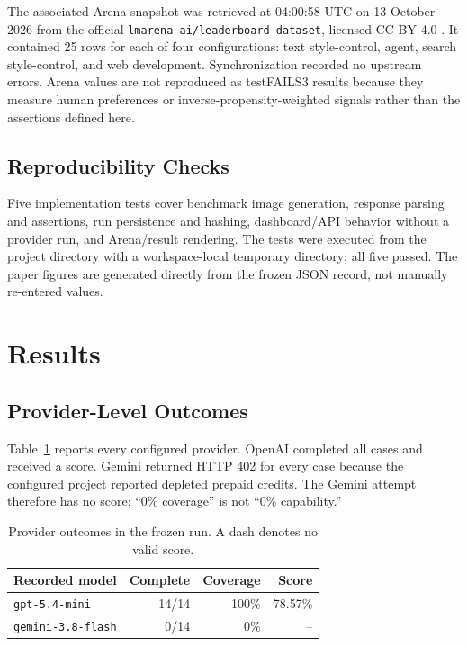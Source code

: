 \documentclass[10pt,twocolumn]{article}
\newcommand{\system}{testFAILS3}
\begin{document}
The associated Arena snapshot was retrieved at 04:00:58 UTC on 13 October 2026 from the official \texttt{lmarena-ai/leaderboard-dataset}, licensed CC BY 4.0 \cite{arenaDataset}. It contained 25 rows for each of four configurations: text style-control, agent, search style-control, and web development. Synchronization recorded no upstream errors. Arena values are not reproduced as \system{} results because they measure human preferences or inverse-propensity-weighted signals rather than the assertions defined here.

\subsection{Reproducibility Checks}
Five implementation tests cover benchmark image generation, response parsing and assertions, run persistence and hashing, dashboard/API behavior without a provider run, and Arena/result rendering. The tests were executed from the project directory with a workspace-local temporary directory; all five passed. The paper figures are generated directly from the frozen JSON record, not manually re-entered values.

\section{Results}
\subsection{Provider-Level Outcomes}
Table~\ref{tab:providers} reports every configured provider. OpenAI completed all cases and received a score. Gemini returned HTTP 402 for every case because the configured project reported depleted prepaid credits. The Gemini attempt therefore has no score; ``0\% coverage'' is not ``0\% capability.''

\begin{table}[t]
\caption{Provider outcomes in the frozen run. A dash denotes no valid score.}
\label{tab:providers}
\centering
\small
\begin{tabularx}{\columnwidth}{@{}Xrrr@{}}
\toprule
Recorded model & Complete & Coverage & Score \\
\midrule
\texttt{gpt-5.4-mini} & 14/14 & 100\% & 78.57\% \\
\texttt{gemini-3.8-flash} & 0/14 & 0\% & -- \\
\bottomrule
\end{tabularx}
\end{table}
\end{document}
